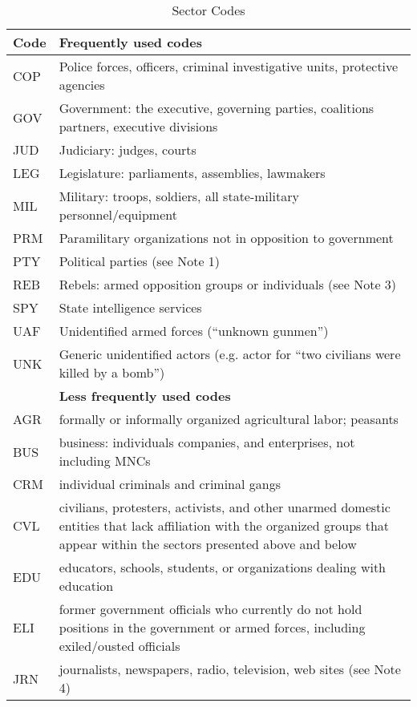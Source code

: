 \documentclass[11pt]{report}
\begin{document}
\begin{center}
\begin{longtable}{|l|p{13cm}|}
\caption{Sector Codes}
\label{tab:roles}
 \\ \cline{1-2}
  \textbf{Code} & \textbf{Frequently used codes}\\
  \hline
	  COP & Police forces, officers, criminal investigative units, protective agencies \\
      GOV & Government: the executive, governing parties, coalitions partners, executive divisions \\
	  JUD & Judiciary: judges, courts \\
	  LEG & Legislature: parliaments, assemblies, lawmakers \\
	  MIL & Military: troops, soldiers, all state-military personnel/equipment\\
	  PRM & Paramilitary organizations not in opposition to government\\
	  PTY & Political parties (see Note 1) \\
	  REB & Rebels: armed opposition groups or individuals (see Note 3)\\
	  SPY & State intelligence services \\
	  UAF & Unidentified armed forces (``unknown gunmen'') \\
	  UNK & Generic unidentified actors (e.g. actor for ``two civilians were killed by a bomb'') \\
  \hline
~   & \textbf{Less frequently used codes}\\
 \hline
 	  AGR & formally or informally organized agricultural labor; peasants \\
      BUS & business: individuals companies, and enterprises, not including MNCs \\
      CRM & individual criminals and criminal gangs \\
	  CVL & civilians, protesters, activists, and other unarmed domestic entities that lack affiliation with the organized groups that appear within the sectors presented above and below  \\
	  EDU & educators, schools, students, or organizations dealing with education \\
      ELI & former government officials who currently do not hold positions in the government or armed forces, including exiled/ousted officials\\
      JRN & journalists, newspapers, radio, television, web sites (see Note 4)  \\

\end{longtable}
\end{center}
\end{document}
